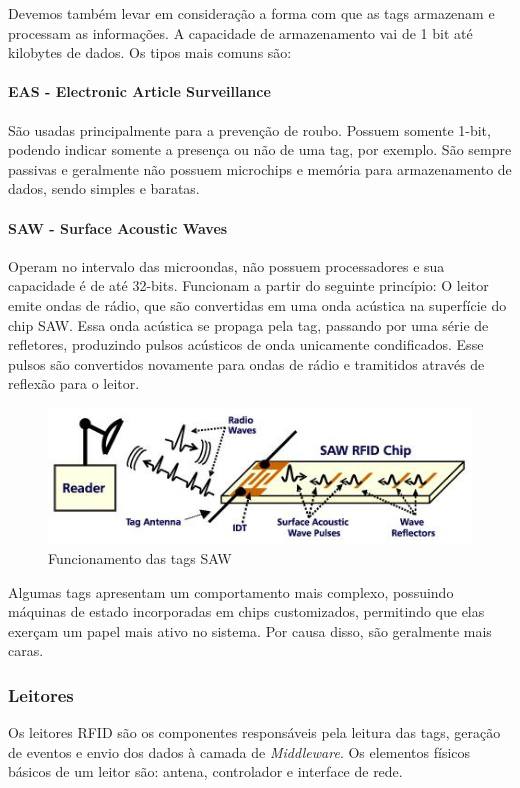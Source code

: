 	Devemos também levar em consideração a forma com que as tags armazenam e processam as informações. A capacidade de armazenamento vai de 1 bit até kilobytes de dados. Os tipos mais comuns são:
	
	\paragraph{EAS - Electronic Article Surveillance} São usadas principalmente para a prevenção de roubo. Possuem somente 1-bit, podendo indicar somente a presença ou não de uma tag, por exemplo. São sempre passivas e geralmente não possuem microchips e memória para armazenamento de dados, sendo simples e baratas. 
	
	\paragraph{SAW - Surface Acoustic Waves} Operam no intervalo das microondas, não possuem processadores e sua capacidade é de até 32-bits. Funcionam a partir do seguinte princípio: O leitor emite ondas de rádio, que são convertidas em uma onda acústica na superfície do chip SAW. Essa onda acústica se propaga pela tag, passando por uma série de refletores, produzindo pulsos acústicos de onda unicamente condificados. Esse pulsos são convertidos novamente  para ondas de rádio e tramitidos através de reflexão para o leitor.
	
		\begin{figure}[h!]
			\centering
			\includegraphics[width=0.5\linewidth]{sawrfid_chip}
			\caption{Funcionamento das tags SAW}
			\label{fig:sawtag}
		\end{figure}
		
	Algumas tags apresentam um comportamento mais complexo, possuindo máquinas de estado incorporadas em chips customizados, permitindo que elas exerçam um papel mais ativo no sistema. Por causa disso, são geralmente mais caras. 
	
	\subsubsection{Leitores}
	Os leitores RFID são os componentes responsáveis pela leitura das tags, geração de eventos e envio dos dados à camada de \textit{Middleware}. Os elementos físicos básicos de um leitor são: antena, controlador e interface de rede.
	
